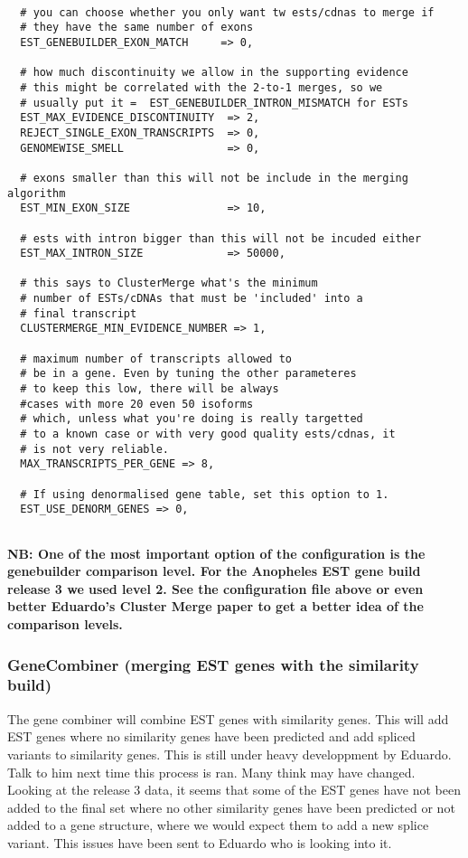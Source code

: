 \documentclass[a4paper,10pt]{article}
\begin{document}
\begin{verbatim}
  
  # you can choose whether you only want tw ests/cdnas to merge if
  # they have the same number of exons
  EST_GENEBUILDER_EXON_MATCH     => 0,
  
  # how much discontinuity we allow in the supporting evidence
  # this might be correlated with the 2-to-1 merges, so we
  # usually put it =  EST_GENEBUILDER_INTRON_MISMATCH for ESTs
  EST_MAX_EVIDENCE_DISCONTINUITY  => 2,
  REJECT_SINGLE_EXON_TRANSCRIPTS  => 0,
  GENOMEWISE_SMELL                => 0,
  
  # exons smaller than this will not be include in the merging algorithm
  EST_MIN_EXON_SIZE               => 10,
  
  # ests with intron bigger than this will not be incuded either
  EST_MAX_INTRON_SIZE             => 50000,
  
  # this says to ClusterMerge what's the minimum
  # number of ESTs/cDNAs that must be 'included' into a
  # final transcript
  CLUSTERMERGE_MIN_EVIDENCE_NUMBER => 1,
  
  # maximum number of transcripts allowed to 
  # be in a gene. Even by tuning the other parameteres
  # to keep this low, there will be always 
  #cases with more 20 even 50 isoforms
  # which, unless what you're doing is really targetted
  # to a known case or with very good quality ests/cdnas, it
  # is not very reliable.
  MAX_TRANSCRIPTS_PER_GENE => 8,
  
  # If using denormalised gene table, set this option to 1.
  EST_USE_DENORM_GENES => 0,
            
\end{verbatim}

\bf{NB:} One of the most important option of the configuration is the genebuilder comparison level. For the Anopheles EST gene build release 3 we used level 2. See the configuration file above or even better Eduardo's Cluster Merge paper to get a better idea of the comparison levels.

\subsubsection{GeneCombiner (merging EST genes with the similarity build)}
The gene combiner will combine EST genes with similarity genes. This will add EST genes where no similarity genes have been predicted and add spliced variants to similarity genes.
This is still under heavy developpment by Eduardo. Talk to him next time this process is ran. Many think may have changed. Looking at the release 3 data, it seems that some of the EST genes have not been added to the final set where no other similarity genes have been predicted or not added to a gene structure, where we would expect them to add a new splice variant. This issues have been sent to Eduardo who is looking into it.
\end{document}
